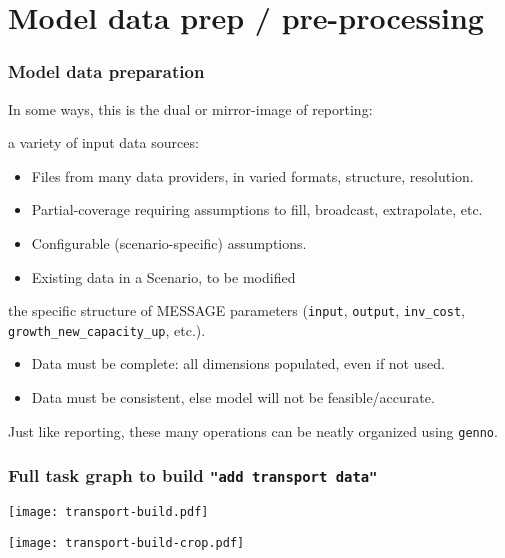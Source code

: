 \documentclass[12pt,aspectratio=169]{beamer}
\renewcommand{\mod}[1]{\texttt{#1}}
\begin{document}
\section{Model data prep / pre-processing}


\begin{frame}
\frametitle{Model data preparation}

In some ways, this is the dual or mirror-image of reporting:

 a variety of input data sources:
\begin{itemize}
  \item Files from many data providers, in varied formats, structure, resolution.
  \item Partial-coverage requiring assumptions to fill, broadcast, extrapolate, etc.
  \item Configurable (scenario-specific) assumptions.
  \item Existing data in a Scenario, to be modified
\end{itemize}

\medskip
{} the specific structure of MESSAGE parameters
(\texttt{input}, \texttt{output}, \texttt{inv\_cost}, \texttt{growth\_new\_capacity\_up}, etc.).
\begin{itemize}
  \item Data must be complete: all dimensions populated, even if not used.
  \item Data must be consistent, else model will not be feasible/accurate.
\end{itemize}

\smallskip
Just like reporting, these many operations can be neatly organized using \mod{genno}.
\end{frame}

\begin{frame}
\frametitle{Full task graph to build \texttt{"add transport data"}}

\hspace*{-10mm}
\texttt{[image: transport-build.pdf]}

\end{frame}

\begin{frame}[plain]

\vspace*{-1mm}
\texttt{[image: transport-build-crop.pdf]}

\end{frame}
\end{document}
